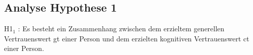 \documentclass[a4paper,11pt]{article}%
\renewcommand{\\}{\vspace*{0.5\baselineskip} \newline}
\begin{document}
%
%

\newpage
	\subsection{Analyse Hypothese 1}
H1$_{1}$ : Es besteht ein Zusammenhang zwischen dem erzieltem generellen Vertrauenswert \ac{gt} einer Person und dem erzielten kognitiven Vertrauenswert \ac{ct} einer Person.
\end{document}
